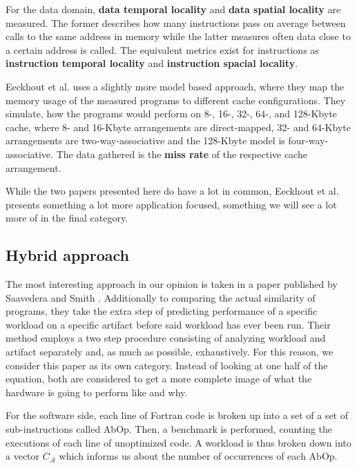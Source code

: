 \documentclass[../bachelor_paper.tex]{subfiles}
\begin{document}
For the data domain, \textbf{data temporal locality} and \textbf{data spatial locality} are measured. The former describes how many instructions pass on average between calls to the same address in memory while the latter measures often data close to a certain address is called. The equivalent metrics exist for instructions as \textbf{instruction temporal locality} and \textbf{instruction spacial locality}.


Eeckhout et al. \cite{eeckhoutDesigningComputerArchitecture2003} uses a slightly more model based approach, where they map the memory usage of the measured programs to different cache configurations. They simulate, how the programs would perform on 8-, 16-, 32-, 64-, and 128-Kbyte cache, where 8- and 16-Kbyte arrangements are direct-mapped, 32- and 64-Kbyte arrangements are two-way-associative and the 128-Kbyte model is four-way-associative. The data gathered is the \textbf{miss rate} of the respective cache arrangement.

While the two papers presented here do have a lot in common, Eeckhout et al. \cite{eeckhoutDesigningComputerArchitecture2003} presents something a lot more application focused, something we will see a lot more of in the final category.


\subsection{Hybrid approach}
	\label{ch:theo/simi/hybr}
The most interesting approach in our opinion is taken in a paper published by Saavedera and Smith \cite{saavedraAnalysisBenchmarkCharacteristics1996}. Additionally to comparing the actual similarity of programs, they take the extra step of predicting performance of a specific workload on a specific artifact before said workload has ever been run. Their method employs a two step procedure consisting of analyzing workload and artifact separately and, as much as possible, exhaustively. For this reason, we consider this paper as its own category. Instead of looking at one half of the equation, both are considered to get a more complete image of what the hardware is going to perform like and why.

For the software side, each line of Fortran code is broken up into a set of a set of sub-instructions called \ac{AbOp}. Then, a benchmark is performed, counting the executions of each line of unoptimized code. A workload is thus broken down into a vector $C_\mathcal{A}$ which informs us about the number of occurrences of each \ac{AbOp}.
\end{document}
